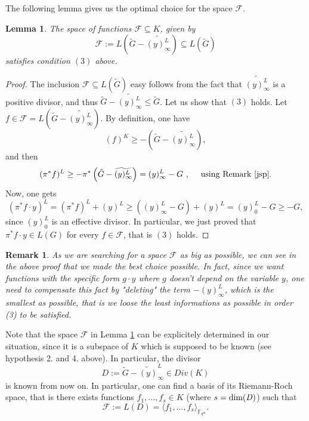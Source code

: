\documentclass[10pt]{article}
\newtheorem{lem1}{Lemma}[]
\newtheorem{rq1}{Remark}[]
\newcommand{\s}{\vspace{0.3cm}}
\newcommand{\cd}{\cdot}
\newcommand{\fqm}{\mathbb{F}_{q^m}}
\newcommand{\su}{\subseteq}
\begin{document}
The following lemma gives us the optimal choice for the space $\mathcal{F}$.

\s

\begin{lem1} \label{constructionD}
The space of functions $\mathcal{F} \su K$, given by 
\[\mathcal{F} := L\left(\widetilde{G}-\widetilde{(y)^L_{\infty}}\right) \su L(\tilde{G})\]
satisfies condition $(3)$ above.
\end{lem1}

\s

\begin{proof}
The inclusion $\mathcal{F} \su L(\tilde{G})$ easy follows from the fact that $\widetilde{(y)^L_{\infty}}$ is a positive divisor, and thus $\tilde{G}-\widetilde{(y)^L_{\infty}} \leq \tilde{G}$. Let us show that $(3)$ holds. Let $f \in \mathcal{F} =  L\left(\tilde{G}-\widetilde{(y)^L_{\infty}}\right)$. By definition, one have 
\[(f)^K \geq -\left(\tilde{G}-\widetilde{(y)^L_{\infty}}\right),\]
and then 
\[(\pi^*f)^L \geq -\pi^*\left(\tilde{G}-\widetilde{(y)^L_{\infty}}\right) = (y)^L_{\infty} - G \ , \ \quad \rm using \ Remark \  \ref{jsp}.\]
Now, one gets 
\[(\pi^*f \cd y)^L = (\pi^*f)^L  + (y)^L \geq  ((y)^L_{\infty} - G)+(y)^L = (y)^L_0 - G \geq -G,\]
since $(y)^L_0$ is an effective divisor. In particular, we just proved that $\pi^*f \cd y \in L(G)$ for every $f \in \mathcal{F}$, that is $(3)$ holds.
\end{proof}

\s

\begin{rq1} \rm \label{remark5}
As we are searching for a space $\mathcal{F}$ as big as possible, we can see in the above proof that we made the best choice possible. In fact, since we want functions with the specific form $g \cd y$ where $g$ doesn't depend on the variable $y$, one need to compensate this fact by "deleting" the term $-(y)^L_{\infty}$, which is the smallest as possible, that is we loose the least informations as possible in order (3) to be satisfied.
\end{rq1}

\s

Note that the space $\mathcal{F}$ in Lemma \ref{constructionD} can be explicitely determined in our situation, since it is a subspace of $K$ which is supposed to be known (see hypothesis 2. and 4. above). In particular, the divisor 
\begin{equation}
D := \tilde{G} - \widetilde{(y)}^L_{\infty} \in Div(K)
\end{equation}
is known from now on. In particular, one can find a basis of its Riemann-Roch space, that is there exists functions $f_1,...,f_s \in K$ (where $s=\rm dim(\it D)$) such that 
\[\mathcal{F} := L(D) = \langle f_1,...,f_s \rangle_{\fqm}.\]
\end{document}
